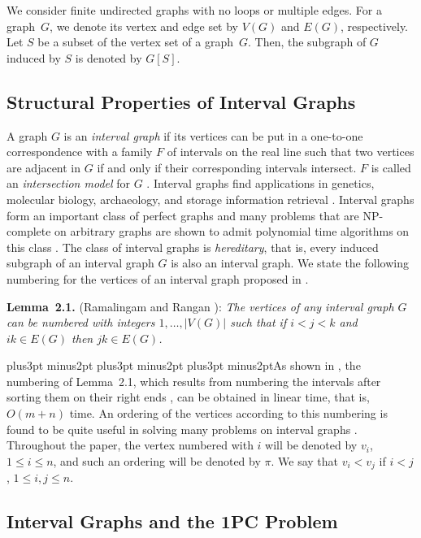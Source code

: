 \documentclass[10pt]{article}
\def\yskip{\penalty-50\vskip3pt plus3pt minus2pt}
\def\yyy{\yskip\yskip\yskip}
\begin{document}
We consider finite undirected graphs with no loops or multiple
edges. For a graph~$G$, we denote its vertex and edge set by
$V(G)$ and $E(G)$, respectively. Let $S$ be a subset of the vertex
set of a graph~$G$. Then, the subgraph of $G$ induced by $S$ is
denoted by $G[S]$.


\vskip 0.2in \subsection{Structural Properties of Interval Graphs}

A graph $G$ is an {\it interval graph} if its vertices can be put
in a one-to-one correspondence with a family $F$ of intervals on
the real line such that two vertices are adjacent in $G$ if and
only if their corresponding intervals intersect. $F$ is called an
{\it intersection model} for $G$ \cite{AR90}. Interval graphs find
applications in genetics, molecular biology, archaeology, and
storage information retrieval \cite{Gol}. Interval graphs form an
important class of perfect graphs \cite{Gol} and many problems
that are NP-complete on arbitrary graphs are shown to admit
polynomial time algorithms on this class \cite{AR90, Gol, Keil}.
The class of interval graphs is {\it hereditary}, that is, every
induced subgraph of an interval graph $G$ is also an interval
graph. We state the following numbering for the vertices of an
interval graph proposed in \cite{RamRan}.

\medskip
\par\noindent
{\bf Lemma~2.1.} (Ramalingam and Rangan \cite{RamRan}): {\it The
vertices of any interval graph $G$ can be numbered with integers
$1, \ldots, |V(G)|$ such that if $i<j<k$ and $ik \in E(G)$ then
$jk \in E(G)$.}

\yyy\noindent As shown in \cite{RamRan}, the numbering of
Lemma~2.1, which results from numbering the intervals after
sorting them on their right ends \cite{AR90}, can be obtained in
linear time, that is, $O(m+n)$ time. An ordering of the vertices
according to this numbering is found to be quite useful in solving
many problems on interval graphs \cite{AR90, RamRan}. Throughout
the paper, the vertex numbered with $i$ will be denoted by $v_i$,
$1 \leq i \leq n$, and such an ordering will be denoted by $\pi$.
We say that $v_i<v_j$ if $i<j$, $1\leq i,j \leq n$.






\vskip 0.2in \subsection{Interval Graphs and the 1PC Problem}
\end{document}
